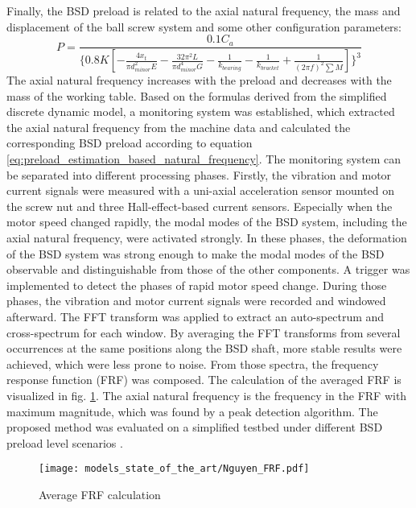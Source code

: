 Finally, the BSD preload is related to the axial natural frequency, the mass and displacement of the ball screw system and some other configuration parameters:
\begin{equation}
    P=\frac{0.1C_{a}}{\{0.8K[ -\frac{4x_{t}}{\pi d_{minor}^{2}E} -\frac{32\pi^{2}L}{\pi d_{minor}^{4}G}-\frac{1}{k_{bearing}}-\frac{1}{k_{bracket}}+\frac{1}{(2\pi f)^{2}\sum M} ]\}^{3}}
\label{eq:preload_estimation_based_natural_frequency}
\end{equation}
The axial natural frequency increases with the preload and decreases with the mass of the working table. Based on the formulas derived from the simplified discrete dynamic model, a monitoring system was established, which extracted the axial natural frequency from the machine data and calculated the corresponding BSD preload according to equation \ref{eq:preload_estimation_based_natural_frequency}. The monitoring system can be separated into different processing phases. Firstly, the vibration and motor current signals were measured with a uni-axial acceleration sensor mounted on the screw nut and three Hall-effect-based current sensors. Especially when the motor speed changed rapidly, the modal modes of the BSD system, including the axial natural frequency, were activated strongly. In these phases, the deformation of the BSD system was strong enough to make the modal modes of the BSD observable and distinguishable from those of the other components. A trigger was implemented to detect the phases of rapid motor speed change. During those phases, the vibration and motor current signals were recorded and windowed afterward. The FFT transform was applied to extract an auto-spectrum and cross-spectrum for each window. By averaging the FFT transforms from several occurrences at the same positions along the BSD shaft, more stable results were achieved, which were less prone to noise. From those spectra, the frequency response function (FRF) was composed. The calculation of the averaged FRF is visualized in fig. \ref{fig:Nguyen_frf}. The axial natural frequency is the frequency in the FRF with maximum magnitude, which was found by a peak detection algorithm. The proposed method was evaluated on a simplified testbed under different BSD preload level scenarios \cite{NGUYEN2019}.

\begin{figure}[H]
  \centering
  \texttt{[image: models\_state\_of\_the\_art/Nguyen\_FRF.pdf]}
  \caption{Average FRF calculation \cite{NGUYEN2019}}
  \label{fig:Nguyen_frf}
\end{figure}

